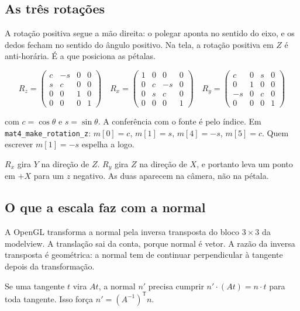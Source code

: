 \documentclass[11pt,a4paper]{article}
\newcommand{\fn}[1]{\texttt{\nobreak\hspace{0pt}#1}}
\begin{document}
\subsection{As três rotações}

A rotação positiva segue a mão direita: o polegar aponta no sentido do eixo, e os dedos fecham no sentido do ângulo positivo. Na tela, a rotação positiva em \(Z\) é anti-horária. É a que posiciona as pétalas.

\[
R_z =
\begin{pmatrix}
c & -s & 0 & 0 \\
s &  c & 0 & 0 \\
0 &  0 & 1 & 0 \\
0 &  0 & 0 & 1
\end{pmatrix}
\quad
R_x =
\begin{pmatrix}
1 & 0 & 0 & 0 \\
0 & c & -s & 0 \\
0 & s &  c & 0 \\
0 & 0 & 0 & 1
\end{pmatrix}
\quad
R_y =
\begin{pmatrix}
c & 0 & s & 0 \\
0 & 1 & 0 & 0 \\
-s & 0 & c & 0 \\
0 & 0 & 0 & 1
\end{pmatrix}
\]

com \(c = \cos\theta\) e \(s = \sin\theta\). A conferência com o fonte é pelo índice. Em \fn{mat4\_make\_rotation\_z}: \(m[0] = c\), \(m[1] = s\), \(m[4] = -s\), \(m[5] = c\). Quem escrever \(m[1] = -s\) espelha a logo.

\(R_x\) gira \(Y\) na direção de \(Z\). \(R_y\) gira \(Z\) na direção de \(X\), e portanto leva um ponto em \(+X\) para um \(z\) negativo. As duas aparecem na câmera, não na pétala.

\subsection{O que a escala faz com a normal}

A OpenGL transforma a normal pela inversa transposta do bloco \(3\times 3\) da modelview. A translação sai da conta, porque normal é vetor. A razão da inversa transposta é geométrica: a normal tem de continuar perpendicular à tangente depois da transformação.

Se uma tangente \(t\) vira \(A t\), a normal \(n'\) precisa cumprir \(n' \cdot (A t) = n \cdot t\) para toda tangente. Isso força \(n' = (A^{-1})^{\mathsf T} n\).
\end{document}
